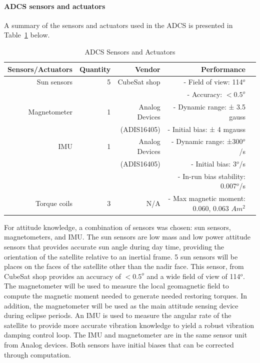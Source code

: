 \documentclass[12pt]{article}
\begin{document}
				\paragraph{ADCS sensors and actuators}
				A summary of the sensors and actuators used in the ADCS is presented in Table~\ref{tab:ADCS_sensors} below. 
\begin{table}[htbp]
  \centering
  \caption{ADCS Sensors and Actuators}
    \begin{tabular}{|r|r|r|r|r|}
    \hline
    Sensors/Actuators & Quantity & Vendor & Performance &  \bigstrut\\
    \hline
    Sun sensors & 5     & CubeSat shop & \multicolumn{1}{r}{- Field of view: 114$^o$} &  \bigstrut[t]\\
          &       &       & \multicolumn{1}{r}{- Accuracy: $< 0.5^o$} &  \bigstrut[b]\\
    \hline
    Magnetometer & 1     & Analog Devices  & \multicolumn{1}{r}{- Dynamic range: ± 3.5 gauss} &  \bigstrut[t]\\
          &       & (ADIS16405) & \multicolumn{1}{r}{- Initial bias: ± 4 mgauss} &  \bigstrut[b]\\
    \hline
    IMU   & 1     & Analog Devices  & \multicolumn{1}{r}{- Dynamic range: ±300$^o$/s} &  \bigstrut[t]\\
          &       & (ADIS16405) & \multicolumn{1}{r}{- Initial bias: 3$^o$/s} &  \\
          &       &       & \multicolumn{1}{r}{- In-run bias stability: 0.007$^o$/s} &  \bigstrut[b]\\
    \hline
    Torque coils & 3     & N/A   & \multicolumn{1}{r}{- Max magnetic moment: 0.060, 0.063 $Am^2$} &  \bigstrut\\
    \hline
    \end{tabular}%
  \label{tab:ADCS_sensors}%
\end{table}%

			For attitude knowledge, a combination of sensors was chosen: sun sensors, magnetometers, and IMU.  The sun sensors are low mass and low power attitude sensors that provides accurate sun angle during day time, providing the orientation of the satellite relative to an inertial frame. 5 sun sensors will be places on the faces of the satellite other than the nadir face. This sensor, from CubeSat shop provides an accuracy of $< 0.5^o$ and a wide field of view of 114$^o$. The magnetometer will be used to measure the local geomagnetic field to compute the magnetic moment needed to generate needed restoring torques. In addition, the magnetometer will be used as the main attitude sensing device during eclipse periods. An IMU is used to measure the angular rate of the satellite to provide more accurate vibration knowledge to yield a robust vibration damping control loop. The IMU and magnetometer are in the same sensor unit from Analog devices. Both sensors have initial biases that can be corrected through computation. 
\end{document}
